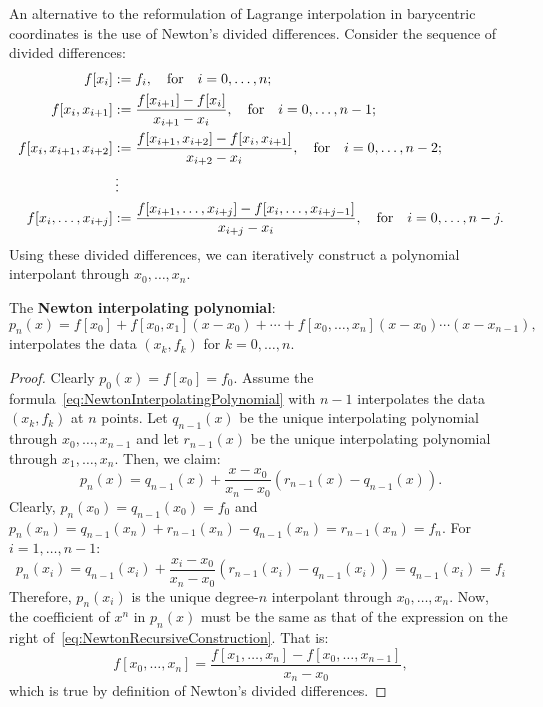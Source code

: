 An alternative to the reformulation of Lagrange interpolation in barycentric coordinates is the use of Newton's divided differences. Consider the sequence of divided differences:
\begin{align*}
f[x_i] & := f_i,\quad{\rm for}\quad i=0,\ldots,n;\\
f[x_i,x_{i+1}] & := \dfrac{f[x_{i+1}]-f[x_i]}{x_{i+1}-x_i},\quad{\rm for}\quad i=0,\ldots,n-1;\\
f[x_i,x_{i+1},x_{i+2}] & := \dfrac{f[x_{i+1},x_{i+2}]-f[x_i,x_{i+1}]}{x_{i+2}-x_i},\quad{\rm for}\quad i=0,\ldots,n-2;\\
& \vdots\\
f[x_i,\ldots,x_{i+j}] & := \dfrac{f[x_{i+1},\ldots,x_{i+j}]-f[x_i,\ldots,x_{i+j-1}]}{x_{i+j}-x_i},\quad{\rm for}\quad i=0,\ldots,n-j.
\end{align*}
Using these divided differences, we can iteratively construct a polynomial interpolant through $x_0,\ldots,x_n$.
\begin{theorem}
The {\bf Newton interpolating polynomial}:
\begin{equation}\label{eq:NewtonInterpolatingPolynomial}
p_n(x) = f[x_0] + f[x_0,x_1](x-x_0) + \cdots + f[x_0,\ldots,x_n](x-x_0)\cdots(x-x_{n-1}),
\end{equation}
interpolates the data $(x_k,f_k)$ for $k=0,\ldots,n$.
\end{theorem}
\begin{proof}
Clearly $p_0(x) = f[x_0] = f_0$. Assume the formula~\eqref{eq:NewtonInterpolatingPolynomial} with $n-1$ interpolates the data $(x_k,f_k)$ at $n$ points. Let $q_{n-1}(x)$ be the unique interpolating polynomial through $x_0,\ldots,x_{n-1}$ and let $r_{n-1}(x)$ be the unique interpolating polynomial through $x_1,\ldots,x_n$. Then, we claim:
\begin{equation}\label{eq:NewtonRecursiveConstruction}
p_n(x) = q_{n-1}(x) + \dfrac{x-x_0}{x_n-x_0}(r_{n-1}(x)-q_{n-1}(x)).
\end{equation}
Clearly, $p_n(x_0) = q_{n-1}(x_0) = f_0$ and $p_n(x_n) = q_{n-1}(x_n) + r_{n-1}(x_n) - q_{n-1}(x_n) = r_{n-1}(x_n) = f_n$. For $i = 1,\ldots,n-1$:
\[
p_n(x_i) = q_{n-1}(x_i) + \dfrac{x_i-x_0}{x_n-x_0}(r_{n-1}(x_i)-q_{n-1}(x_i)) = q_{n-1}(x_i) = f_i
\]
Therefore, $p_n(x_i)$ is the unique degree-$n$ interpolant through $x_0,\ldots,x_n$. Now, the coefficient of $x^n$ in $p_n(x)$ must be the same as that of the expression on the right of~\eqref{eq:NewtonRecursiveConstruction}. That is:
\[
f[x_0,\ldots,x_n] = \dfrac{f[x_1,\ldots,x_n]-f[x_0,\ldots,x_{n-1}]}{x_n-x_0},
\]
which is true by definition of Newton's divided differences.
\end{proof}

